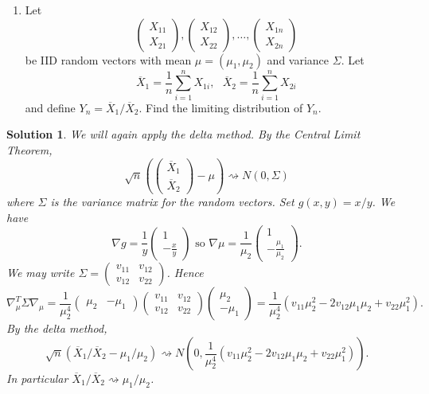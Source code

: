 \documentclass[10pt]{article}
\newtheorem*{sol}{Solution}
\begin{document}
\begin{enumerate}
\item[(15)] Let
\[
\begin{pmatrix} X_{11} \\ X_{21} \end{pmatrix},
\begin{pmatrix} X_{12} \\ X_{22} \end{pmatrix},
\ldots,
\begin{pmatrix} X_{1n} \\ X_{2n} \end{pmatrix}
\]
be IID random vectors with mean $\mu=(\mu_1,\mu_2)$ and variance $\Sigma$.
Let
\[
\overline X_1 = \frac{1}{n}\sum_{i=1}^n X_{1i}, \ \ \
\overline X_2 = \frac{1}{n}\sum_{i=1}^n X_{2i}
\]
and define $Y_n=\overline X_1/\overline X_2$.
Find the limiting distribution of $Y_n$.
\end{enumerate}

\begin{sol}
We will again apply the delta method. By the Central Limit Theorem,
\[
\sqrt{n}\left(\begin{pmatrix} \overline X_1 \\ \overline X_2 \end{pmatrix} - \mu \right)
\rightsquigarrow N(0,\Sigma)
\]
where $\Sigma$ is the variance matrix for the random vectors.
Set $g(x,y)=x/y$. We have
\[
\nabla g = \frac{1}{y} \begin{pmatrix} 1 \\ -\frac{x}{y} \end{pmatrix} \text{ so }
\nabla \mu = \frac{1}{\mu_2} \begin{pmatrix} 1 \\ -\frac{\mu_1}{\mu_2}\end{pmatrix}.
\]
We may write
$\Sigma = \begin{pmatrix} v_{11} & v_{12} \\ v_{12} & v_{22} \end{pmatrix}$.
Hence
\[
\nabla_\mu^T \Sigma \nabla_\mu =
\frac{1}{\mu_2^4} \begin{pmatrix} \mu_2 & -\mu_1\end{pmatrix}
\begin{pmatrix} v_{11} & v_{12} \\ v_{12} & v_{22} \end{pmatrix}
\begin{pmatrix} \mu_2 \\ -\mu_1 \end{pmatrix} =
\frac{1}{\mu_2^4}(v_{11}\mu_2^2 - 2v_{12}\mu_1\mu_2 + v_{22}\mu_1^2).
\]
By the delta method,
\[
\sqrt{n}(\overline X_1/\overline X_2 - \mu_1/\mu_2) \rightsquigarrow
N\left(0,\frac{1}{\mu_2^4}(v_{11}\mu_2^2 - 2v_{12}\mu_1\mu_2 + v_{22}\mu_1^2)\right).
\]
In particular $\overline X_1/\overline X_2 \rightsquigarrow \mu_1/\mu_2$.
\end{sol}
\end{document}
